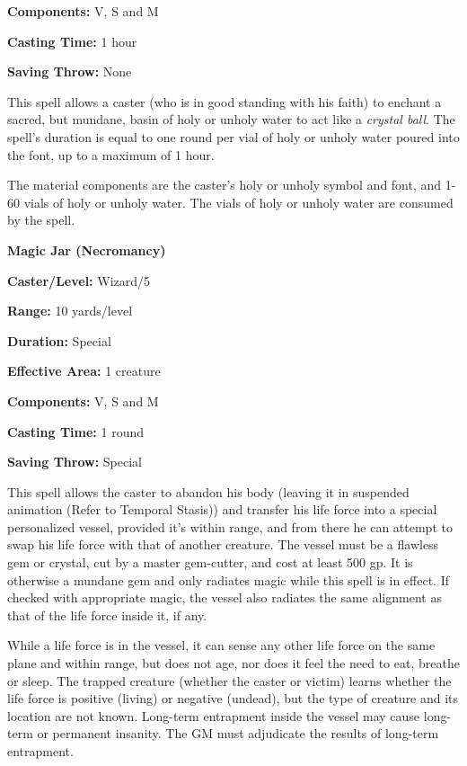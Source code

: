 \begin{multicols}{2}
\begin{minipage}{\columnwidth}
\noindent \textbf{Components:} V, S and M

\noindent \textbf{Casting Time:} 1 hour

\noindent \textbf{Saving Throw:} None

\end{minipage}

This spell allows a caster (who is in good standing with his faith) to enchant a sacred, but mundane, basin of holy or unholy water to act like a \textit{crystal ball}.  The spell's duration is equal to one round per vial of holy or unholy water poured into the font, up to a maximum of 1 hour.

The material components are the caster's holy or unholy symbol and font, and 1-60 vials of holy or unholy water.  The vials of holy or unholy water are consumed by the spell.

\vspace{1em}

\noindent
\begin{minipage}{\columnwidth}

\noindent \textbf{Magic Jar (Necromancy)}

\noindent \textbf{Caster/Level:} Wizard/5

\noindent \textbf{Range:} 10 yards/level

\noindent \textbf{Duration:} Special

\noindent \textbf{Effective Area:} 1 creature

\noindent \textbf{Components:} V, S and M

\noindent \textbf{Casting Time:} 1 round

\noindent \textbf{Saving Throw:} Special

\end{minipage}

This spell allows the caster to abandon his body (leaving it in suspended animation (Refer to Temporal Stasis)) and transfer his life force into a special personalized vessel, provided it's within range, and from there he can attempt to swap his life force with that of another creature.  The vessel must be a flawless gem or crystal, cut by a master gem-cutter, and cost at least 500 gp.  It is otherwise a mundane gem and only radiates magic while this spell is in effect.  If checked with appropriate magic, the vessel also radiates the same alignment as that of the life force inside it, if any.

While a life force is in the vessel, it can sense any other life force on the same plane and within range, but does not age, nor does it feel the need to eat, breathe or sleep.  The trapped creature (whether the caster or victim) learns whether the life force is positive (living) or negative (undead), but the type of creature and its location are not known.  Long-term entrapment inside the vessel may cause long-term or permanent insanity.  The GM must adjudicate the results of long-term entrapment.


\end{multicols}
